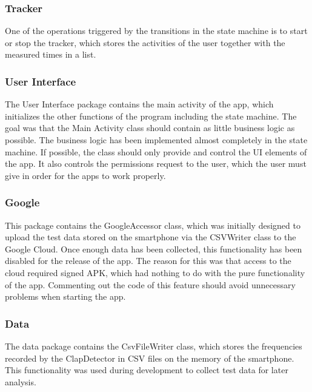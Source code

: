 \subsubsection{Tracker}
\label{sec:orgd2cdde2}

One of the operations triggered by the transitions in the state machine is to start or stop the tracker, 
which stores the activities of the user together with the measured times in a list.

\subsubsection{User Interface}
\label{sec:org2938786}

The User Interface package contains the main activity of the app, which initializes the other functions of 
the program including the state machine. The goal was that the Main Activity class should contain as little 
business logic as possible. The business logic has been implemented almost completely in the state machine. 
If possible, the class should only provide and control the UI elements of the app. It also controls the permissions 
request to the user, which the user must give in order for the apps to work properly.

\subsubsection{Google}
\label{sec:org3d3dca0}
This package contains the GoogleAccessor class, which was initially designed to upload the test data stored on the 
smartphone via the CSVWriter class to the Google Cloud. Once enough data has been collected, this functionality has 
been disabled for the release of the app. The reason for this was that access to the cloud required signed APK, 
which had nothing to do with the pure functionality of the app. Commenting out the code of this feature should 
avoid unnecessary problems when starting the app.

\subsubsection{Data}
\label{sec:orgdeb052b}
The data package contains the CsvFileWriter class, which stores the frequencies recorded by the ClapDetector in 
CSV files on the memory of the smartphone. This functionality was used during development to collect test data 
for later analysis.

